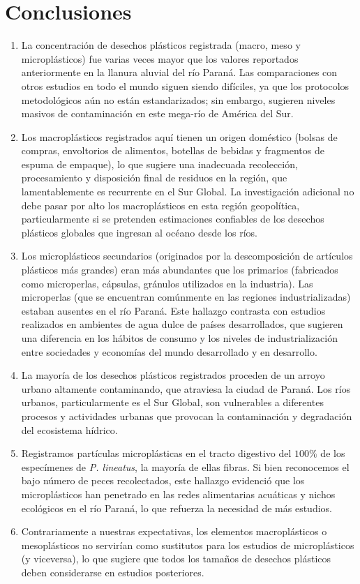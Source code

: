 \section{Conclusiones}%
\label{sec:conclusiones}

\begin{enumerate}
	\item La concentración de desechos plásticos registrada (macro, meso y microplásticos) fue varias veces mayor que los valores reportados anteriormente en la llanura aluvial del río Paraná. Las comparaciones con otros estudios en todo el mundo siguen siendo difíciles, ya que los protocolos metodológicos aún no están estandarizados; sin embargo, sugieren niveles masivos de contaminación en este mega-río de América del Sur.
	\item Los macroplásticos registrados aquí tienen un origen doméstico (bolsas de compras, envoltorios de alimentos, botellas de bebidas y fragmentos de espuma de empaque), lo que sugiere una inadecuada recolección, procesamiento y disposición final de residuos en la región, que lamentablemente es recurrente en el Sur Global. La investigación adicional no debe pasar por alto los macroplásticos en esta región geopolítica, particularmente si se pretenden estimaciones confiables de los desechos plásticos globales que ingresan al océano desde los ríos.
	\item Los microplásticos secundarios (originados por la descomposición de artículos plásticos más grandes) eran más abundantes que los primarios (fabricados como microperlas, cápsulas, gránulos utilizados en la industria). Las microperlas (que se encuentran comúnmente en las regiones industrializadas) estaban ausentes en el río Paraná. Este hallazgo contrasta con estudios realizados en ambientes de agua dulce de países desarrollados, que sugieren una diferencia en los hábitos de consumo y los niveles de industrialización entre sociedades y economías del mundo desarrollado y en desarrollo.
	\item La mayoría de los desechos plásticos registrados proceden de un arroyo urbano altamente contaminando, que atraviesa la ciudad de Paraná. Los ríos urbanos, particularmente es el Sur Global, son vulnerables a diferentes procesos y actividades urbanas que provocan la contaminación y degradación del ecosistema hídrico.
	\item Registramos partículas microplásticas en el tracto digestivo del $100\%$ de los especímenes de \textit{P. lineatus}, la mayoría de ellas fibras. Si bien reconocemos el bajo número de peces recolectados, este hallazgo evidenció que los microplásticos han penetrado en las redes alimentarias acuáticas y nichos ecológicos en el río Paraná, lo que refuerza la necesidad de más estudios.
	\item  Contrariamente a nuestras expectativas, los elementos macroplásticos o mesoplásticos no servirían como sustitutos para los estudios de microplásticos (y viceversa), lo que sugiere que todos los tamaños de desechos plásticos deben considerarse en estudios posteriores.
\end{enumerate}
